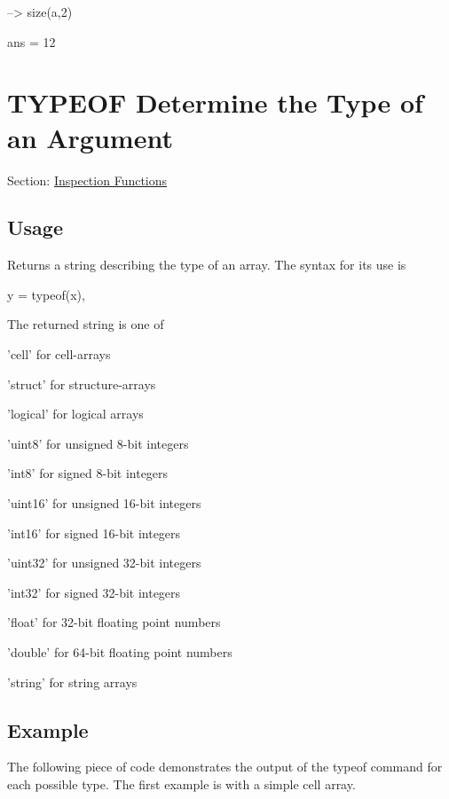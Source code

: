 \begin{DoxyVerbInclude}
--> size(a,2)

ans = 
 12 
\end{DoxyVerbInclude}
 \hypertarget{inspection_typeof}{}\section{T\-Y\-P\-E\-O\-F Determine the Type of an Argument}\label{inspection_typeof}
Section\-: \hyperlink{sec_inspection}{Inspection Functions} \hypertarget{vtkwidgets_vtkxyplotwidget_Usage}{}\subsection{Usage}\label{vtkwidgets_vtkxyplotwidget_Usage}
Returns a string describing the type of an array. The syntax for its use is \begin{DoxyVerb}   y = typeof(x),
\end{DoxyVerb}
 The returned string is one of 
\begin{DoxyItemize}
\item {\ttfamily 'cell'} for cell-\/arrays  
\item {\ttfamily 'struct'} for structure-\/arrays  
\item {\ttfamily 'logical'} for logical arrays  
\item {\ttfamily 'uint8'} for unsigned 8-\/bit integers  
\item {\ttfamily 'int8'} for signed 8-\/bit integers  
\item {\ttfamily 'uint16'} for unsigned 16-\/bit integers  
\item {\ttfamily 'int16'} for signed 16-\/bit integers  
\item {\ttfamily 'uint32'} for unsigned 32-\/bit integers  
\item {\ttfamily 'int32'} for signed 32-\/bit integers  
\item {\ttfamily 'float'} for 32-\/bit floating point numbers  
\item {\ttfamily 'double'} for 64-\/bit floating point numbers  
\item {\ttfamily 'string'} for string arrays  
\end{DoxyItemize}\hypertarget{variables_struct_Example}{}\subsection{Example}\label{variables_struct_Example}
The following piece of code demonstrates the output of the {\ttfamily typeof} command for each possible type. The first example is with a simple cell array.


